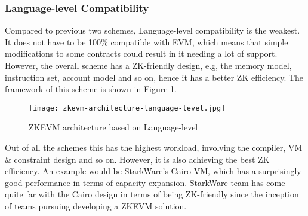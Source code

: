 \subsubsection{Language-level Compatibility}

Compared to previous two schemes, Language-level compatibility is the weakest. It does not have to be 100\% compatible with EVM, which means that simple modifications to some contracts could result in it needing a lot of support. However, the overall scheme has a ZK-friendly design, e.g, the memory model, instruction set, account model and so on, hence it has a better ZK efficiency. The framework of this scheme is shown in Figure \ref{fig:zkevm-architecture-language-level}.
\begin{figure}[!ht]
    \centering
    \texttt{[image: zkevm-architecture-language-level.jpg]}
    \caption{ZKEVM architecture based on Language-level}
    \label{fig:zkevm-architecture-language-level}
\end{figure}

Out of all the schemes this has the highest workload, involving the compiler, VM \& constraint design and so on. However, it is also achieving the best ZK efficiency. An example would be StarkWare's Cairo VM, which has a surprisingly good performance in terms of capacity expansion. StarkWare team has come quite far with the Cairo design in terms of being ZK-friendly since the inception of teams pursuing developing a ZKEVM solution.

